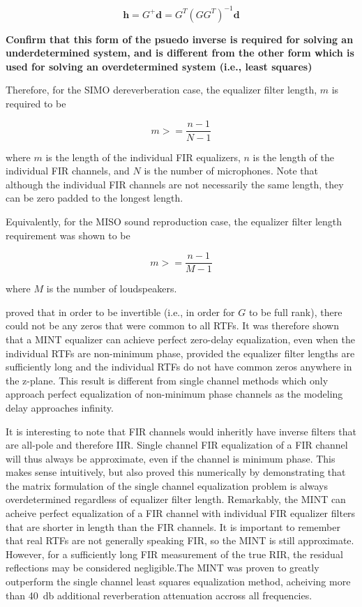 \begin{equation}
	\boldsymbol{h} = G^+\boldsymbol{d} = G^T(GG^T)^{-1}\boldsymbol{d}
\end{equation}

\textbf{Confirm that this form of the psuedo inverse is required for solving an underdetermined system, and is different from the other form which is used for solving an overdetermined system (i.e., least squares)}

 Therefore, for the SIMO dereverberation case, the equalizer filter length, $m$ is required to be

\begin{equation}
	m >= \frac{n-1}{N-1}
\end{equation}

\noindent
where $m$ is the length of the individual FIR equalizers, $n$ is the length of the individual FIR channels, and $N$ is the number of microphones. Note that although the individual FIR channels are not necessarily the same length, they can be zero padded to the longest length.

Equivalently, for the MISO sound reproduction case, the equalizer filter length requirement was shown to be

\begin{equation}
	m >= \frac{n-1}{M-1}
\end{equation}

\noindent
where $M$ is the number of loudspeakers.


 \cite{miyoshi1986inverse} proved that in order to be invertible (i.e., in order for $G$ to be full rank), there could not be any zeros that were common to all RTFs. It was therefore shown that a MINT equalizer can achieve perfect zero-delay equalization, even when the individual RTFs are non-minimum phase, provided the equalizer filter lengths are sufficiently long and the individual RTFs do not have common zeros anywhere in the z-plane. This result is different from single channel methods which only approach perfect equalization of non-minimum phase channels as the modeling delay approaches infinity. 
 
 It is interesting to note that FIR channels would inheritly have inverse filters that are all-pole and therefore IIR. Single channel FIR equalization of a FIR channel will thus always be approximate, even if the channel is minimum phase. This makes sense intuitively, but \cite{miyoshi1986inverse} also proved this numerically by demonstrating that the matrix formulation of the single channel equalization problem is always overdetermined regardless of equalizer filter length. Remarkably, the MINT can acheive perfect equalization of a FIR channel with individual FIR equalizer filters that are shorter in length than the FIR channels. It is important to remember that real RTFs are not generally speaking FIR, so the MINT is still approximate. However, for a sufficiently long FIR measurement of the true RIR, the residual reflections may be considered negligible.The MINT was proven to greatly outperform the single channel least squares equalization method, acheiving more than \qty{40}{\decibel} additional reverberation attenuation accross all frequencies.
 
